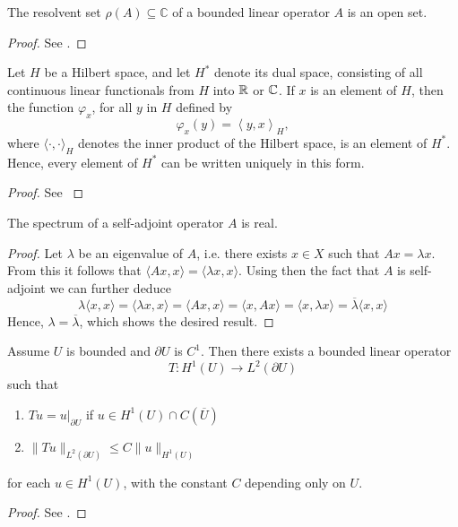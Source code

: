 \begin{atheorem}
	The resolvent set $\rho(A) \subseteq \mathbb{C}$ of a bounded linear operator $A$ is an open set.
	
	\begin{proof}
		See \cite[p. 259]{werner2006funkana}.
	\end{proof}
\end{atheorem}

\begin{atheorem}
	Let $H$ be a Hilbert space, and let $H^{*}$ denote its dual space, consisting of all continuous linear functionals from $H$ into $\mathbb{R}$ or $\mathbb{C}$. If $x$ is an element of $H$, then the function $\varphi_{x}$, for all $y$ in $H$ defined by
	\[ \varphi_{x}(y) = \left\langle y,x\right\rangle_{H}, \]
	where $\langle \cdot ,\cdot \rangle_{H}$ denotes the inner product of the Hilbert space, is an element of $H^{*}$. Hence, every element of $H^{*}$ can be written uniquely in this form.
	
	\begin{proof}
		See \cite[p. 284]{evans1998partial}
	\end{proof}
\end{atheorem}

\begin{atheorem} \label{spectrul-sa-real}
	The spectrum of a self-adjoint operator $A$ is real. 
	
	\begin{proof}
		Let $\lambda$ be an eigenvalue of $A$, i.e. there exists $x \in X$ such that $A x = \lambda x$. From this it follows that $\langle A x, x \rangle = \langle \lambda x , x \rangle$. Using then the fact that $A$ is self-adjoint we can further deduce
		\[ \lambda \langle x , x \rangle = \langle \lambda x , x \rangle = \langle A x, x \rangle = \langle x, A x \rangle = \langle x , \lambda x \rangle = \overline{\lambda} \langle  x , x \rangle \]
		Hence, $\lambda = \overline{\lambda}$, which shows the desired result.
	\end{proof}
\end{atheorem}

\begin{atheorem}
	Assume $U$ is bounded and $\partial U$ is $C^{1}$. Then there exists a bounded linear operator
		\[ T \colon H^{1}(U) \rightarrow L^{2}(\partial U) \]
	such that
	\begin{enumerate}[label=\alph*\upshape)]
		\item $Tu = u\big|_{\partial U}$ if $u \in H^{1}(U) \cap C(\overline{U})$
		\item $\|Tu\|_{L^{2}(\partial U)} \leq C \|u\|_{H^{1}(U)}$
	\end{enumerate}
	for each $u \in H^{1}(U)$, with the constant $C$ depending only on $U$.
	
	\begin{proof}
		See \cite[p. 258]{evans1998partial}.
	\end{proof}
\end{atheorem}

